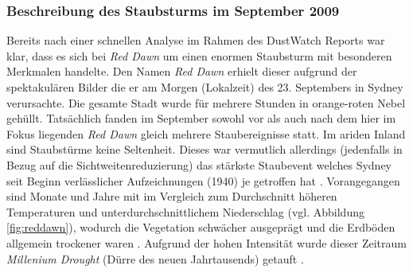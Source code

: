 \documentclass[12pt,a4paper,onecolumn]{scrartcl}
\begin{document}
\subsubsection{Beschreibung des Staubsturms im September 2009} \label{sec:reddawn}
Bereits nach einer schnellen Analyse im Rahmen des DustWatch Reports \citep{Leys.2009} war klar, dass es sich bei \textit{Red Dawn} um einen enormen Staubsturm mit besonderen Merkmalen handelte. Den Namen \textit{Red Dawn} erhielt dieser aufgrund der spektakulären Bilder die er am Morgen (Lokalzeit) des 23. Septembers in Sydney verursachte. Die gesamte Stadt wurde für mehrere Stunden in orange-roten Nebel gehüllt. Tatsächlich fanden im September sowohl vor als auch nach dem hier im Fokus liegenden \textit{Red Dawn} gleich mehrere Staubereignisse statt. Im ariden Inland sind Staubstürme keine Seltenheit. Dieses war vermutlich allerdings (jedenfalls in Bezug auf die Sichtweitenreduzierung) das stärkste Staubevent welches Sydney seit Beginn verlässlicher Aufzeichnungen (1940) je getroffen hat \citep{Leys.2011}. Vorangegangen sind Monate und Jahre mit im Vergleich zum Durchschnitt höheren Temperaturen und unterdurchschnittlichem Niederschlag (vgl. Abbildung \ref{fig:reddawn}), wodurch die Vegetation schwächer ausgeprägt und die Erdböden allgemein trockener waren \citep{Leys.2011}. Aufgrund der hohen Intensität wurde dieser Zeitraum \textit{Millenium Drought} (Dürre des neuen Jahrtausends) getauft \citep{Deckker.2014}.
\end{document}
